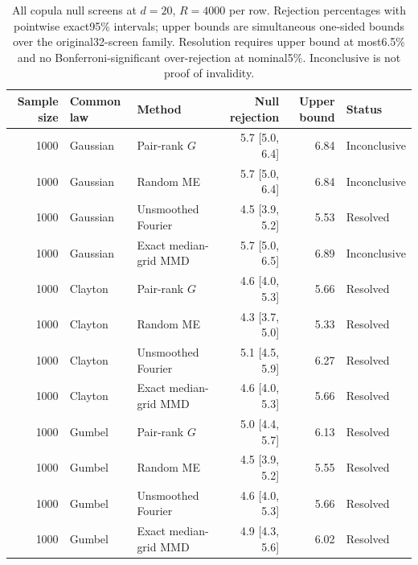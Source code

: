 \begin{table}[t]
\centering
\scriptsize
\caption{All copula null screens at $d=20$, $R=4000$ per row. Rejection percentages with pointwise exact95\% intervals; upper bounds are simultaneous one-sided bounds over the original32-screen family. Resolution requires upper bound at most6.5\% and no Bonferroni-significant over-rejection at nominal5\%. Inconclusive is not proof of invalidity.}
\label{tab:dependence-null-copula-20}
{\setlength{\tabcolsep}{8pt}\renewcommand{\arraystretch}{1.2}
\begin{tabular}{rllrrl}
\toprule
Sample size & Common law & Method & Null rejection & Upper bound & Status\\
\midrule
1000 & Gaussian & Pair-rank $G$ & 5.7 [5.0, 6.4] & 6.84 & Inconclusive\\
1000 & Gaussian & Random ME & 5.7 [5.0, 6.4] & 6.84 & Inconclusive\\
1000 & Gaussian & Unsmoothed Fourier & 4.5 [3.9, 5.2] & 5.53 & Resolved\\
1000 & Gaussian & Exact median-grid MMD & 5.7 [5.0, 6.5] & 6.89 & Inconclusive\\
1000 & Clayton & Pair-rank $G$ & 4.6 [4.0, 5.3] & 5.66 & Resolved\\
1000 & Clayton & Random ME & 4.3 [3.7, 5.0] & 5.33 & Resolved\\
1000 & Clayton & Unsmoothed Fourier & 5.1 [4.5, 5.9] & 6.27 & Resolved\\
1000 & Clayton & Exact median-grid MMD & 4.6 [4.0, 5.3] & 5.66 & Resolved\\
1000 & Gumbel & Pair-rank $G$ & 5.0 [4.4, 5.7] & 6.13 & Resolved\\
1000 & Gumbel & Random ME & 4.5 [3.9, 5.2] & 5.55 & Resolved\\
1000 & Gumbel & Unsmoothed Fourier & 4.6 [4.0, 5.3] & 5.66 & Resolved\\
1000 & Gumbel & Exact median-grid MMD & 4.9 [4.3, 5.6] & 6.02 & Resolved\\
\bottomrule
\end{tabular}}
\end{table}

